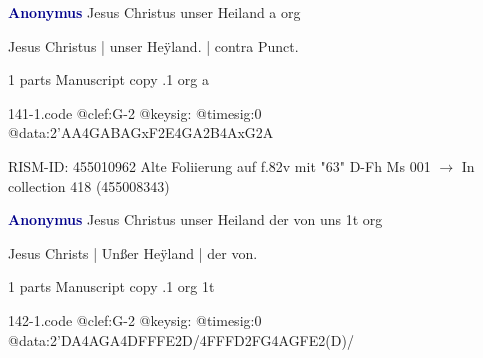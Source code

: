 \documentclass[twocolumn]{book}
\begin{document}
\newline \par \vspace{7pt} \textcolor{darkblue}{\textbf{Anonymus  }}
\newline Jesus Christus unser Heiland  a  
\newline org
\newline \begin{itshape}[f.82v, at left:] Jesus Christus | unser Heÿland. | contra Punct.\end{itshape} 
\newline \textcolor{darkblue}{}  1 parts  
\newline Manuscript copy
.1  org  a  
\begin{filecontents*}{141-1.code}
@clef:G-2
@keysig:
@timesig:0
@data:2'AA4GABAGxF2E4GA2B4AxG2A
\end{filecontents*}
\newline
%

\newline RISM-ID: 455010962
\newline Alte Foliierung auf f.82v mit "63"
\newline D-Fh  Ms 001
\newline $\rightarrow$ In collection 418 (455008343)

\newline \par \vspace{7pt} \textcolor{darkblue}{\textbf{Anonymus  }}
\newline Jesus Christus unser Heiland der von uns  1t  
\newline org
\newline \begin{itshape}[f.35r, at left:] Jesus Christs | Unßer Heÿland | der von.\end{itshape} 
\newline \textcolor{darkblue}{}  1 parts  
\newline Manuscript copy
.1  org  1t  
\begin{filecontents*}{142-1.code}
@clef:G-2
@keysig:
@timesig:0
@data:2'DA4AGA4DFFFE2D/4FFFD2FG4AGFE2(D)/
\end{filecontents*}
\newline
%
\end{document}
